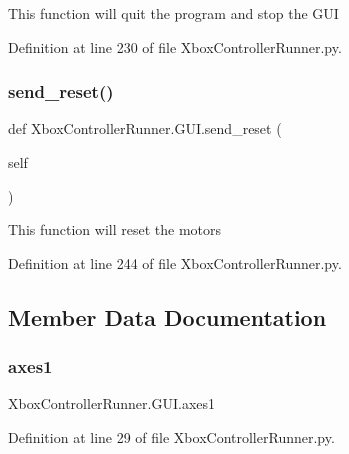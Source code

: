 \begin{DoxyVerb}This function will quit the program and stop the GUI\end{DoxyVerb}
 

Definition at line 230 of file Xbox\+Controller\+Runner.\+py.

\mbox{\label{class_xbox_controller_runner_1_1_g_u_i_a7cab3eedc2c645b1f3d786bd6d8edffd}} 
\subsubsection{\texorpdfstring{send\+\_\+reset()}{send\_reset()}}
{\footnotesize\ttfamily def Xbox\+Controller\+Runner.\+G\+U\+I.\+send\+\_\+reset (\begin{DoxyParamCaption}\item[{}]{self }\end{DoxyParamCaption})}

\begin{DoxyVerb}This function will reset the motors\end{DoxyVerb}
 

Definition at line 244 of file Xbox\+Controller\+Runner.\+py.



\subsection{Member Data Documentation}
\mbox{\label{class_xbox_controller_runner_1_1_g_u_i_af74a819867619c92b520e3b25413ab37}} 
\subsubsection{\texorpdfstring{axes1}{axes1}}
{\footnotesize\ttfamily Xbox\+Controller\+Runner.\+G\+U\+I.\+axes1}



Definition at line 29 of file Xbox\+Controller\+Runner.\+py.

